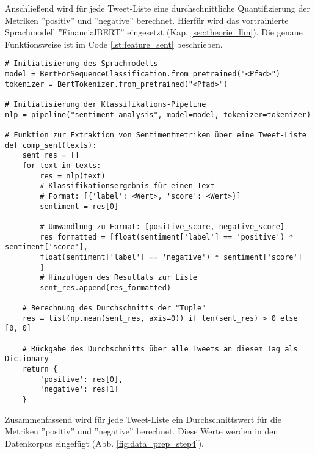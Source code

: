 Anschließend wird für jede Tweet-Liste eine durchschnittliche Quantifizierung der Metriken ''positiv'' und ''negative'' berechnet. Hierfür wird das vortrainierte Sprachmodell ''FinancialBERT'' eingesetzt (Kap. \ref{sec:theorie_llm}). Die genaue Funktionsweise ist im Code \ref{lst:feature_sent} beschrieben.
\begin{lstlisting}[caption={Stimmung quantifiziert als Positiv/Negativ-Score}, label=lst:feature_sent, captionpos=t]
# Initialisierung des Sprachmodells
model = BertForSequenceClassification.from_pretrained("<Pfad>")
tokenizer = BertTokenizer.from_pretrained("<Pfad>")

# Initialisierung der Klassifikations-Pipeline
nlp = pipeline("sentiment-analysis", model=model, tokenizer=tokenizer)

# Funktion zur Extraktion von Sentimentmetriken über eine Tweet-Liste
def comp_sent(texts):
	sent_res = []
	for text in texts:
		res = nlp(text)
		# Klassifikationsergebnis für einen Text
		# Format: [{'label': <Wert>, 'score': <Wert>}]
		sentiment = res[0]
		
		# Umwandlung zu Format: [positive_score, negative_score]
		res_formatted = [float(sentiment['label'] == 'positive') * sentiment['score'], 
		float(sentiment['label'] == 'negative') * sentiment['score']
		]
		# Hinzufügen des Resultats zur Liste
		sent_res.append(res_formatted)

	# Berechnung des Durchschnitts der "Tuple"
	res = list(np.mean(sent_res, axis=0)) if len(sent_res) > 0 else [0, 0]

	# Rückgabe des Durchschnitts über alle Tweets an diesem Tag als Dictionary
	return {
		'positive': res[0],
		'negative': res[1]
	}
\end{lstlisting}
Zusammenfassend wird für jede Tweet-Liste ein Durchschnittswert für die Metriken ''positiv'' und ''negative'' berechnet. Diese Werte werden in den Datenkorpus eingefügt (Abb. \ref{fig:data_prep_step4}).


